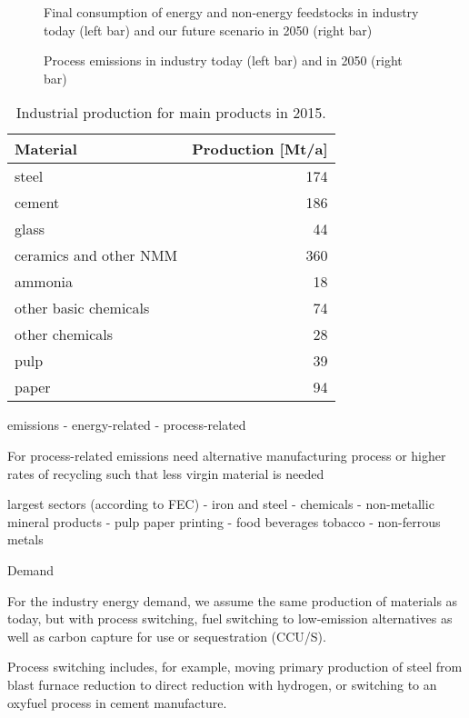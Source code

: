 \begin{figure}
    \caption{Final consumption of energy and non-energy feedstocks in industry today (left bar) and
    our future scenario in 2050 (right bar)}
\end{figure}

\begin{figure}
    \caption{Process emissions in industry today (left bar) and in 2050 (right bar)}
\end{figure}

\begin{table}[t]
    \centering
    \setlength{\tabcolsep}{6pt}
    \begin{tabular}{@{} p{5cm}r @{}}
      \toprule
      Material & Production [Mt/a] \\
      \midrule
      steel & 174 \\
      cement & 186 \\
      glass & 44 \\
      ceramics and other NMM & 360 \\
      ammonia & 18 \\
      other basic chemicals & 74 \\
      other chemicals & 28 \\
      pulp & 39 \\
      paper & 94 \\
    \end{tabular}
    \caption{Industrial production for main products in 2015.}
    \label{tab:industryproduction}
  \end{table}


emissions
- energy-related
- process-related

For process-related emissions need alternative manufacturing process
or higher rates of recycling such that less virgin material is needed

largest sectors (according to FEC)
- iron and steel
- chemicals
- non-metallic mineral products
- pulp paper printing
- food beverages tobacco
- non-ferrous metals

Demand

For the industry energy demand, we assume the same
production of materials as today, but with process switching, fuel switching to
low-emission alternatives as well as carbon capture for use or sequestration
(CCU/S).

Process switching includes, for example, moving primary production of
steel from blast furnace reduction to direct reduction with hydrogen, or
switching to an oxyfuel process in cement manufacture.

